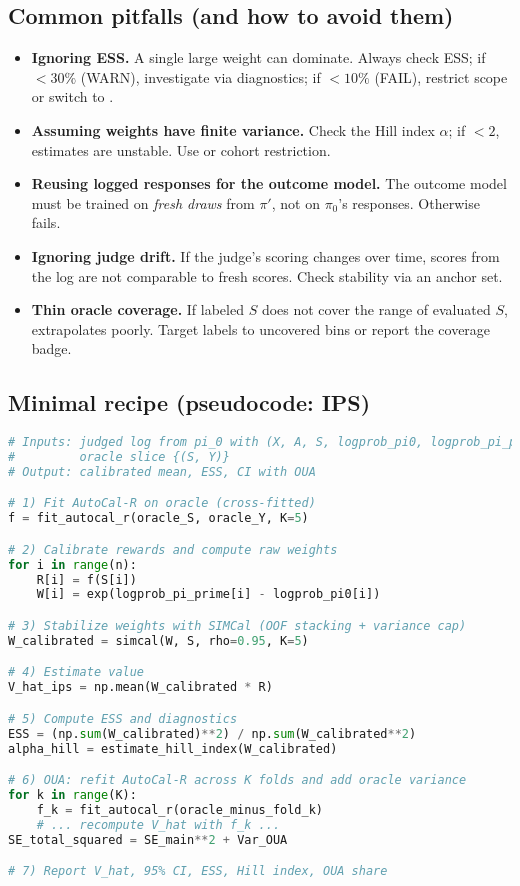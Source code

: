 \subsection{Common pitfalls (and how to avoid them)}

\begin{itemize}
\item \textbf{Ignoring ESS.} A single large weight can dominate. Always check ESS; if $< 30\%$ (WARN), investigate via diagnostics; if $< 10\%$ (FAIL), restrict scope or switch to \dr.

\item \textbf{Assuming weights have finite variance.} Check the Hill index $\alpha$; if $< 2$, estimates are unstable. Use \simcal{} or cohort restriction.

\item \textbf{Reusing logged responses for the outcome model.} The outcome model must be trained on \emph{fresh draws} from $\pi'$, not on $\pi_0$'s responses. Otherwise \dr{} fails.

\item \textbf{Ignoring judge drift.} If the judge's scoring changes over time, scores from the log are not comparable to fresh scores. Check stability via an anchor set.

\item \textbf{Thin oracle coverage.} If labeled $S$ does not cover the range of evaluated $S$, \autocal{} extrapolates poorly. Target labels to uncovered bins or report the coverage badge.
\end{itemize}

\subsection{Minimal recipe (pseudocode: IPS)}

\begin{lstlisting}[language=Python,caption=Calibrated IPS Recipe]
# Inputs: judged log from pi_0 with (X, A, S, logprob_pi0, logprob_pi_prime)
#         oracle slice {(S, Y)}
# Output: calibrated mean, ESS, CI with OUA

# 1) Fit AutoCal-R on oracle (cross-fitted)
f = fit_autocal_r(oracle_S, oracle_Y, K=5)

# 2) Calibrate rewards and compute raw weights
for i in range(n):
    R[i] = f(S[i])
    W[i] = exp(logprob_pi_prime[i] - logprob_pi0[i])

# 3) Stabilize weights with SIMCal (OOF stacking + variance cap)
W_calibrated = simcal(W, S, rho=0.95, K=5)

# 4) Estimate value
V_hat_ips = np.mean(W_calibrated * R)

# 5) Compute ESS and diagnostics
ESS = (np.sum(W_calibrated)**2) / np.sum(W_calibrated**2)
alpha_hill = estimate_hill_index(W_calibrated)

# 6) OUA: refit AutoCal-R across K folds and add oracle variance
for k in range(K):
    f_k = fit_autocal_r(oracle_minus_fold_k)
    # ... recompute V_hat with f_k ...
SE_total_squared = SE_main**2 + Var_OUA

# 7) Report V_hat, 95% CI, ESS, Hill index, OUA share
\end{lstlisting}

